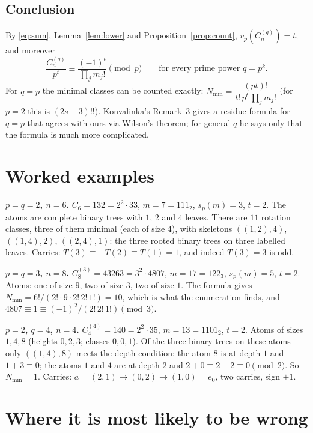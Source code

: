 \documentclass[11pt]{article}
\theoremstyle{definition}
\newcommand{\vp}{v_p}
\newcommand{\sd}{s_p}
\newcommand{\C}[1]{C^{(q)}_{#1}}
\begin{document}
\subsection*{Conclusion}

By \eqref{eq:sum}, Lemma~\ref{lem:lower} and Proposition~\ref{prop:count},
$\vp(\C{n})=t$, and moreover
\[
  \frac{\C{n}}{p^{t}}\equiv\frac{(-1)^t}{\prod_j m_j!}\pmod p
  \qquad\text{for every prime power } q=p^k .
\]
For $q=p$ the minimal classes can be counted exactly:
$N_{\min}=\dfrac{(pt)!}{t!\,p^{t}\,\prod_j m_j!}$ (for $p=2$ this is $(2s-3)!!$).
Konvalinka's Remark~3 gives a residue formula for $q=p$ that agrees with ours via Wilson's
theorem; for general $q$ he says only that the formula is much more complicated.

\section{Worked examples}

\textbf{$p=q=2$, $n=6$.} $C_6=132=2^2\cdot 33$, $m=7=111_2$, $\sd(m)=3$, $t=2$. The atoms are
complete binary trees with $1$, $2$ and $4$ leaves. There are $11$ rotation classes, three of
them minimal (each of size $4$), with skeletons $((1,2),4)$, $((1,4),2)$, $((2,4),1)$: the
three rooted binary trees on three labelled leaves. Carries: $T(3)\equiv-T(2)\equiv T(1)=1$,
and indeed $T(3)=3$ is odd.

\textbf{$p=q=3$, $n=8$.} $C^{(3)}_8=43263=3^2\cdot 4807$, $m=17=122_3$, $\sd(m)=5$, $t=2$.
Atoms: one of size $9$, two of size $3$, two of size $1$. The formula gives
$N_{\min}=6!/(2!\cdot 9\cdot 2!\,2!\,1!)=10$, which is what the enumeration finds, and
$4807\equiv 1\equiv (-1)^2/(2!\,2!\,1!)\pmod 3$.

\textbf{$p=2$, $q=4$, $n=4$.} $C^{(4)}_4=140=2^2\cdot 35$, $m=13=1101_2$, $t=2$. Atoms of
sizes $1,4,8$ (heights $0,2,3$; classes $0,0,1$). Of the three binary trees on these atoms
only $((1,4),8)$ meets the depth condition: the atom $8$ is at depth $1$ and $1+3\equiv0$;
the atoms $1$ and $4$ are at depth $2$ and $2+0\equiv 2+2\equiv 0 \pmod 2$. So $N_{\min}=1$.
Carries: $a=(2,1)\to(0,2)\to(1,0)=e_0$, two carries, sign $+1$.

\section{Where it is most likely to be wrong}\label{sec:risk}
\end{document}
